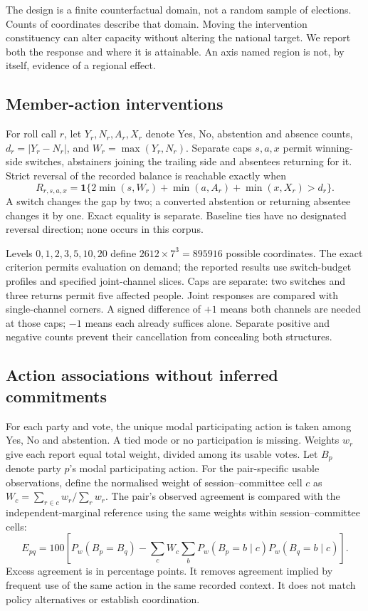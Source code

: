 \documentclass[11pt,a4paper]{article}
\newcommand{\ind}{\mathbf{1}}
\begin{document}
The design is a finite counterfactual domain, not a random sample of elections. Counts of coordinates describe that domain. Moving the intervention constituency can alter capacity without altering the national target. We report both the response and where it is attainable. An axis named region is not, by itself, evidence of a regional effect.

\subsection{Member-action interventions}

For roll call \(r\), let \(Y_r,N_r,A_r,X_r\) denote Yes, No, abstention and absence counts, \(d_r=|Y_r-N_r|\), and \(W_r=\max(Y_r,N_r)\). Separate caps \(s,a,x\) permit winning-side switches, abstainers joining the trailing side and absentees returning for it. Strict reversal of the recorded balance is reachable exactly when
\[
R_{r,s,a,x}
=\ind\{2\min(s,W_r)+\min(a,A_r)+\min(x,X_r)>d_r\}.
\]
A switch changes the gap by two; a converted abstention or returning absentee changes it by one. Exact equality is separate. Baseline ties have no designated reversal direction; none occurs in this corpus.

Levels \(0,1,2,3,5,10,20\) define \(2612\times7^3=895916\) possible coordinates. The exact criterion permits evaluation on demand; the reported results use switch-budget profiles and specified joint-channel slices. Caps are separate: two switches and three returns permit five affected people. Joint responses are compared with single-channel corners. A signed difference of \(+1\) means both channels are needed at those caps; \(-1\) means each already suffices alone. Separate positive and negative counts prevent their cancellation from concealing both structures.

\subsection{Action associations without inferred commitments}

For each party and vote, the unique modal participating action is taken among Yes, No and abstention. A tied mode or no participation is missing. Weights \(w_r\) give each report equal total weight, divided among its usable votes. Let \(B_p\) denote party \(p\)'s modal participating action. For the pair-specific usable observations, define the normalised weight of session--committee cell \(c\) as \(W_c=\sum_{r\in c}w_r/\sum_rw_r\). The pair's observed agreement is compared with the independent-marginal reference using the same weights within session--committee cells:
\[
E_{pq}=100\left[
P_w(B_p=B_q)-\sum_cW_c\sum_bP_w(B_p=b\mid c)P_w(B_q=b\mid c)
\right].
\]
Excess agreement is in percentage points. It removes agreement implied by frequent use of the same action in the same recorded context. It does not match policy alternatives or establish coordination.
\end{document}
